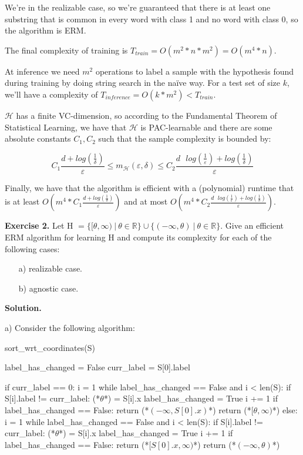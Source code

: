 \documentclass{article}
\newcommand{\<}{\langle}
\renewcommand{\>}{\rangle}
\theoremstyle{definition}
\begin{document}
We're in the realizable case, so we're guaranteed that there is at least one substring that is common in every word with class 1 and no word with class 0, so the algorithm is ERM.

The final complexity of training is $T_{train}=O(m^2*n*m^2) = O(m^4*n)$.

At inference we need $m^2$ operations to label a sample with the hypothesis found during training by doing string search in the naïve way. For a test set of size $k$, we'll have a complexity of $T_{inference}=O(k*m^2) < T_{train}$.

$\mathcal{H}$ has a finite VC-dimension, so according to the Fundamental Theorem of Statistical Learning, we have that $\mathcal{H}$ is PAC-learnable and there are some absolute constants $C_1, C_2$ such that the sample complexity is bounded by:

$$
C_1\frac{d+log(\frac{1}{\delta})}{\varepsilon} 
\leq
m_\mathcal{H}(\varepsilon, \delta)\leq C_2\frac{d\text{ }log(\frac{1}{\varepsilon})+log(\frac{1}{\delta})}{\varepsilon}
$$

Finally, we have that the algorithm is efficient with a (polynomial) runtime that is at least $O(m^4*C_1\frac{d+log(\frac{1}{\delta})}{\varepsilon} 
)$ and at most $O(m^4*C_2\frac{d\text{ }log(\frac{1}{\varepsilon})+log(\frac{1}{\delta})}{\varepsilon})$.

\vspace{3mm}

\textbf{Exercise 2.} Let H $= \{ [\theta, \infty) \ | \ \theta \in \mathbb{R} \} \cup \{ (-\infty, \theta) \ | \ \theta \in \mathbb{R} \}$. Give an efficient ERM algorithm for learning H and compute its complexity for each of the following cases:

\begin{itemize}
    \item[a)] realizable case.
    \item[b)] agnostic case.
\end{itemize}

\textbf{Solution.}

a)  Consider the following algorithm:

\begin{mylisting}
sort_wrt_coordinates(S)

label_has_changed = False
curr_label = S[0].label

if curr_label == 0:
    i = 1
    while label_has_changed == False and i < len(S):
        if S[i].label != curr_label:
            (*$\theta$*) = S[i].x
            label_has_changed = True
        i += 1
    if label_has_changed == False:
        return (*$(-\infty, S[0].x)$*)
    return (*$[\theta, \infty)$*)
else:
    i = 1
    while label_has_changed == False and i < len(S):
        if S[i].label != curr_label:
            (*$\theta$*) = S[i].x
            label_has_changed = True
        i += 1
    if label_has_changed == False:
        return (*$[S[0].x, \infty)$*)
    return (*$(-\infty, \theta)$*)
\end{mylisting}
\end{document}
